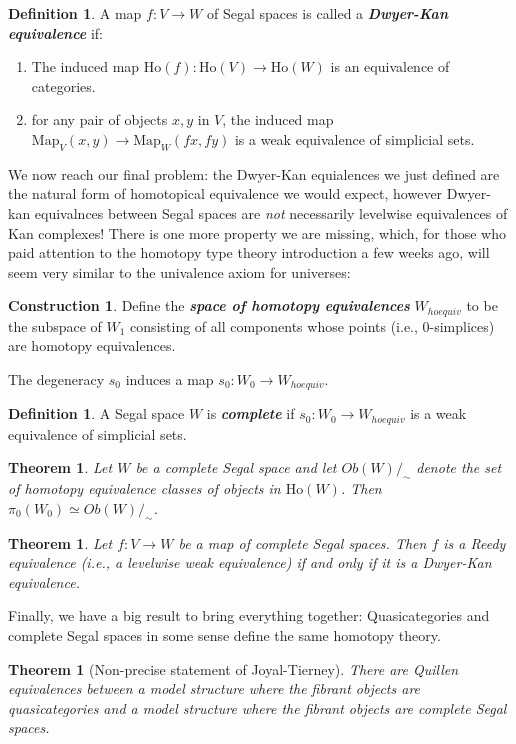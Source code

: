 \documentclass{article}
\newcommand{\textbi}[1]{\textbf{\textit{#1}}}
\newcommand{\Ho}{\mathrm{Ho}}
\newcommand{\Map}{\mathrm{Map}}
\newtheorem{thm}[subsection]{Theorem}
\theoremstyle{definition}
\newtheorem{defin}[subsection]{Definition}
\newtheorem{cons}[subsection]{Construction}
\begin{document}
\begin{defin}
    A map $f: V \to W$ of Segal spaces is called a \textbi{Dwyer-Kan equivalence} if:
    \begin{enumerate}
        \item The induced map $\Ho(f):\Ho(V)\to \Ho(W)$ is an equivalence of categories.
        \item for any pair of objects $x,y$ in $V$, the induced map $\Map_{V}(x,y)\to \Map_{W}(fx, fy)$ is a weak equivalence of simplicial sets.
    \end{enumerate}
\end{defin}

We now reach our final problem: the Dwyer-Kan equialences we just defined are the natural form of homotopical equivalence we would expect, however Dwyer-kan equivalnces between Segal spaces are \textit{not} necessarily levelwise equivalences of Kan complexes! There is one more property we are missing, which, for those who paid attention to the homotopy type theory introduction a few weeks ago, will seem very similar to the univalence axiom for universes:

\begin{cons}
    \par Define the \textbi{space of homotopy equivalences} $W_{hoequiv}$ to be the subspace of $W_1$ consisting of all components whose points (i.e., 0-simplices) are homotopy equivalences. 
\par The degeneracy $s_0$ induces a map $s_0:W_0\to W_{hoequiv}$.
\end{cons}

\begin{defin}
    A Segal space $W$ is \textbi{complete} if $s_0:W_0\to W_{hoequiv}$ is a weak equivalence of simplicial sets.
\end{defin}

\begin{thm}
    Let $W$ be a complete Segal space and let $Ob(W)/_\sim$ denote the set of homotopy equivalence classes of objects in $\Ho(W)$. Then $\pi_0(W_0)\simeq Ob(W)/_\sim$.
\end{thm}

\begin{thm}
    Let $f:V \to W$ be a map of complete Segal spaces. Then $f$ is a Reedy equivalence (i.e., a levelwise weak equivalence) if and only if it is a Dwyer-Kan equivalence.
\end{thm}

Finally, we have a big result to bring everything together: Quasicategories and complete Segal spaces in some sense define the same homotopy theory.

\begin{thm}[Non-precise statement of Joyal-Tierney]
    There are Quillen equivalences between a model structure where the fibrant objects are quasicategories and a model structure where the fibrant objects are complete Segal spaces.
\end{thm}
\end{document}
